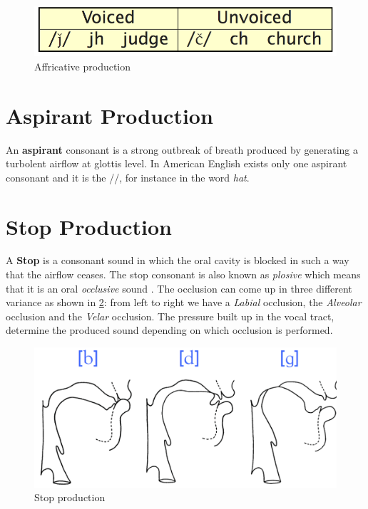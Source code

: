 \begin{figure}[!ht]
    \centering
    \includegraphics[scale=0.5]{Figures/affricative_production.png}
    \caption{Affricative production \cite{mit_phonetics}}
    \label{fig:affricate_prod}
\end{figure}


\section{Aspirant Production}
\label{sec:Aspirant Production}
An \textbf{aspirant} consonant is a strong outbreak of breath produced by generating a turbolent airflow at glottis level. In American English exists only one aspirant consonant and it is the //, for instance in the word \textit{hat}.


\section{Stop Production}
\label{sec:Stop Producton}
A \textbf{Stop} is a consonant sound in which the oral cavity is blocked in such a way that the airflow ceases. The stop consonant is also known as \textit{plosive} which means that it is an oral \textit{occlusive} sound \cite{stop_consonants_wiki}. The occlusion can come up in three different variance as shown in \ref{fig:stop_prod}: from left to right we have a \textit{Labial} occlusion, the \textit{Alveolar} occlusion and the \textit{Velar} occlusion. The pressure built up in the vocal tract, determine the produced sound depending on which occlusion is performed.

\begin{figure}[!ht]
    \centering
    \includegraphics[scale=0.5]{Figures/stop_production.png}
    \caption{Stop production \cite{mit_phonetics}}
    \label{fig:stop_prod}
\end{figure}


